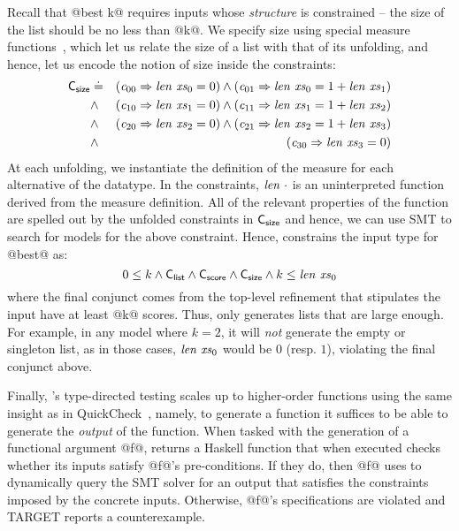 Recall that @best k@ requires inputs whose \emph{structure} is constrained -- the 
size of the list should be no less than @k@. We specify size using special measure 
functions~\cite{VazouICFP14}, which let us relate the size of a list with that of
its unfolding, and hence, let us encode the notion of size inside the constraints:
%
\begin{eqnarray*}
\mathsf{{C_{size}}} & \doteq & (\mathit{{c}}_{00} \Rightarrow \mathit{{len}}\ {\mathit{{xs}}_{0}} = 0) \wedge 
                          (\mathit{{c}}_{01} \Rightarrow \mathit{{len}}\ {\mathit{{xs}}_{0}} = 1 + \mathit{{len}}\ {\mathit{{xs}}_1}) \\
               & \wedge & (\mathit{{c}}_{10} \Rightarrow \mathit{{len}}\ {\mathit{{xs}}_{1}} = 0) \wedge 
                          (\mathit{{c}}_{11} \Rightarrow \mathit{{len}}\ {\mathit{{xs}}_{1}} = 1 + \mathit{{len}}\ {\mathit{{xs}}_2}) \\
               & \wedge & (\mathit{{c}}_{20} \Rightarrow \mathit{{len}}\ {\mathit{{xs}}_{2}} = 0) \wedge 
                          (\mathit{{c}}_{21} \Rightarrow \mathit{{len}}\ {\mathit{{xs}}_{2}} = 1 + \mathit{{len}}\ {\mathit{{xs}}_3}) \\
               & \wedge & (\mathit{{c}}_{30} \Rightarrow \mathit{{len}}\ {\mathit{{xs}}_{3}} = 0)
\end{eqnarray*}
%
At each unfolding, we instantiate the definition of the measure 
for each alternative of the datatype. 
%
In the constraints, $\mathit{{len}}\ {\cdot}$ is an uninterpreted function derived
from the measure definition. All of the relevant properties of the function
are spelled out by the unfolded constraints in $\mathsf{{C_{size}}}$ and hence,
we can use SMT to search for models for the above constraint.
%
Hence, \toolname constrains the input type for @best@ as:
%
$$     0 \leq k 
\wedge \mathsf{{C_{list}}} 
\wedge \mathsf{{C_{score}}} 
\wedge \mathsf{{C_{size}}} 
\wedge k \leq \mathit{{len}}\ {\mathit{{xs}}_0} $$
%
where the final conjunct comes from the top-level refinement that 
stipulates the input have at least @k@ scores.
%
Thus, \toolname only generates lists that are large enough. 
For example, in any model where $k = 2$, it will \emph{not} 
generate the empty or singleton list, as in those cases, 
$\mathit{{len}}\ {\mathit{{xs}}_0}$ would be $0$ (resp. $1$), violating the 
final conjunct above.

Finally, \toolname's type-directed testing scales up to higher-order
functions using the same insight as in QuickCheck~\cite{claessen_quickcheck:_2000}, namely, 
to generate a function it suffices to be able to 
generate the \emph{output} of the function.
When tasked with the generation of a functional argument @f@, \toolname 
returns a Haskell function that when executed checks
whether its inputs satisfy @f@'s pre-conditions.
If they do, then @f@ uses \toolname to dynamically
query the SMT solver for an output that satisfies the 
constraints imposed by the concrete inputs.
Otherwise, @f@'s specifications are violated
and TARGET reports a counterexample.

